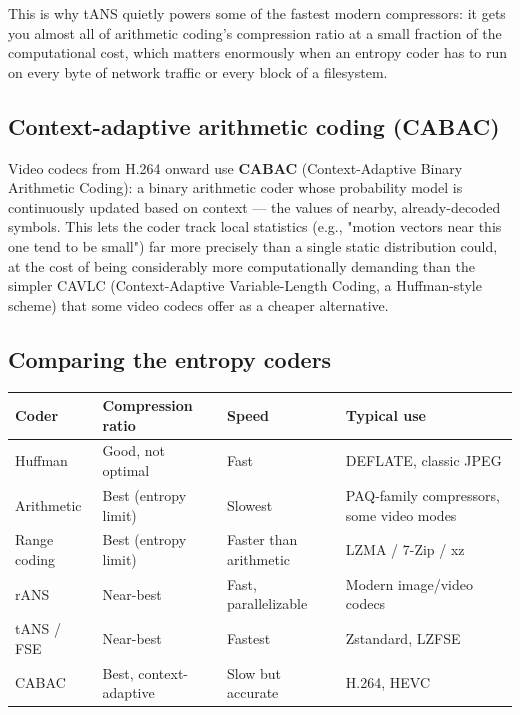 \documentclass[11pt]{article}
\begin{document}
This is why tANS quietly powers some of the fastest modern compressors: it gets you almost all of arithmetic coding's compression ratio at a small fraction of the computational cost, which matters enormously when an entropy coder has to run on every byte of network traffic or every block of a filesystem.

\subsection{Context-adaptive arithmetic coding (CABAC)}

Video codecs from H.264 onward use \textbf{CABAC} (Context-Adaptive Binary Arithmetic Coding): a binary arithmetic coder whose probability model is continuously updated based on context — the values of nearby, already-decoded symbols. This lets the coder track local statistics (e.g., "motion vectors near this one tend to be small") far more precisely than a single static distribution could, at the cost of being considerably more computationally demanding than the simpler CAVLC (Context-Adaptive Variable-Length Coding, a Huffman-style scheme) that some video codecs offer as a cheaper alternative.

\subsection{Comparing the entropy coders}

\begin{center}
\renewcommand{\arraystretch}{1.3}
\begin{tabular}{@{}L{2.6cm}L{2.6cm}L{2.6cm}L{4.8cm}@{}}
\toprule
\textbf{Coder} & \textbf{Compression ratio} & \textbf{Speed} & \textbf{Typical use} \\
\midrule
Huffman & Good, not optimal & Fast & DEFLATE, classic JPEG \\
Arithmetic & Best (entropy limit) & Slowest & PAQ-family compressors, some video modes \\
Range coding & Best (entropy limit) & Faster than arithmetic & LZMA / 7-Zip / xz \\
rANS & Near-best & Fast, parallelizable & Modern image/video codecs \\
tANS / FSE & Near-best & Fastest & Zstandard, LZFSE \\
CABAC & Best, context-adaptive & Slow but accurate & H.264, HEVC \\
\bottomrule
\end{tabular}
\end{center}
\end{document}
